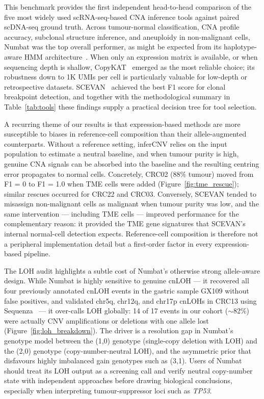 \documentclass[11pt]{article}
\begin{document}
This benchmark provides the first independent head-to-head comparison of the
five most widely used scRNA-seq-based CNA inference tools against paired
scDNA-seq ground truth. Across tumour-normal classification, CNA profile
accuracy, subclonal structure inference, and aneuploidy in non-malignant
cells, Numbat was the top overall performer, as might be expected from its
haplotype-aware HMM architecture~\cite{gao2023numbat}. When only an
expression matrix is available, or when sequencing depth is shallow,
CopyKAT~\cite{gao2021copykat} emerged as the most reliable choice; its
robustness down to 1K UMIs per cell is particularly valuable for low-depth
or retrospective datasets. SCEVAN~\cite{defalco2023scevan} achieved the best
F1 score for clonal breakpoint detection, and together with the
methodological summary in Table~\ref{tab:tools} these findings supply a
practical decision tree for tool selection.

A recurring theme of our results is that expression-based methods are more
susceptible to biases in reference-cell composition than their
allele-augmented counterparts. Without a reference setting, inferCNV relies
on the input population to estimate a neutral baseline, and when tumour
purity is high, genuine CNA signals can be absorbed into the baseline and
the resulting centring error propagates to normal cells. Concretely, CRC02
(88\% tumour) moved from F1 = 0 to F1 = 1.0 when TME cells were added
(Figure~\ref{fig:tme_rescue}); similar rescues occurred for CRC22 and CRC03.
Conversely, SCEVAN tended to misassign non-malignant cells as malignant when
tumour purity was low, and the same intervention --- including TME cells
--- improved performance for the complementary reason: it provided the TME
gene signatures that SCEVAN's internal normal-cell detection expects.
Reference-cell composition is therefore not a peripheral implementation
detail but a first-order factor in every expression-based pipeline.

The LOH audit highlights a subtle cost of Numbat's otherwise strong
allele-aware design. While Numbat is highly sensitive to genuine cnLOH ---
it recovered all four previously annotated cnLOH events in the gastric
sample GX109 without false positives, and validated chr5q, chr12q, and
chr17p cnLOHs in CRC13 using Sequenza~\cite{favero2015sequenza} --- it
over-calls LOH globally: 14 of 17 events in our cohort ($\sim$82\%) were
actually CNV amplifications or deletions with one allele lost
(Figure~\ref{fig:loh_breakdown}). The driver is a resolution gap in
Numbat's genotype model between the (1,0) genotype (single-copy deletion
with LOH) and the (2,0) genotype (copy-number-neutral LOH), and the
asymmetric prior that disfavours highly imbalanced gain genotypes such as
(3,1). Users of Numbat should treat its LOH output as a screening call and
verify neutral copy-number state with independent approaches before drawing
biological conclusions, especially when interpreting tumour-suppressor loci
such as \emph{TP53}.
\end{document}
